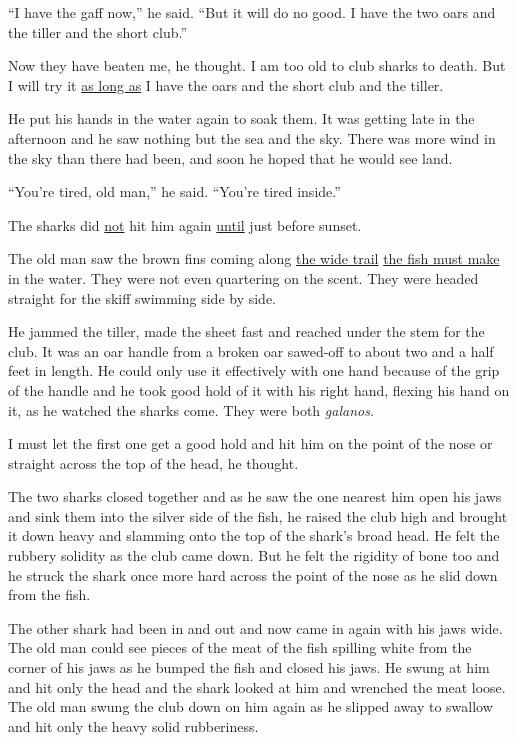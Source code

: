 ``I have the gaff now,'' he said. ``But it will do no good. I have the two
oars and the tiller and the short club.''

Now they have beaten me, he thought. I am too old to club sharks to death.
But I will try it \uline{as long as} I have the oars and the short club and the
tiller.

He put his hands in the water again to soak them. It was getting late in the
afternoon and he saw nothing but the sea and the sky. There was more wind in
the sky than there had been, and soon he hoped that he would see land.

``You're tired, old man,'' he said. ``You're tired inside.''

The sharks did \uline{not} hit him again \uline{until} just before sunset.

The old man saw the brown fins coming along \uline{the wide trail} \uline{the fish
  must make} in the water. They were not even quartering on the scent. They
were headed straight for the skiff swimming side by side.

He jammed the tiller, made the sheet fast and reached under the stem for the
club. It was an oar handle from a broken oar \gls{sawed-off} to about two
and a half feet in length. He could only use it \gls{effectively} with one
hand because of the \gls{grip} of the handle and he took good hold of it with his
right hand, \gls{flexing} his hand on it, as he watched the sharks come.
They were both \emph{galanos}.

I must let the first one get a good hold and hit him on the point of the
nose or straight across the top of the head, he thought.

The two sharks closed together and as he saw the one nearest him open his
jaws and \gls{sink} them into the silver side of the fish, he raised the club high
and brought it down heavy and \gls{slamming} onto the top of the shark's
broad head. He felt the \gls{rubbery} \gls{solidity} as the club came down.
But he felt the \gls{rigidity} of bone too and he struck the shark once more
hard across the point of the nose as he slid down from the fish.

The other shark had been in and out and now came in again with his jaws
wide. The old man could see pieces of the meat of the fish \gls{spilling}
white from the corner of his jaws as he bumped the fish and closed his jaws.
He swung at him and hit only the head and the shark looked at him and
\gls{wrenched} the meat loose. The old man swung the club down on him again as he
slipped away to swallow and hit only the heavy solid \gls{rubberiness}.

